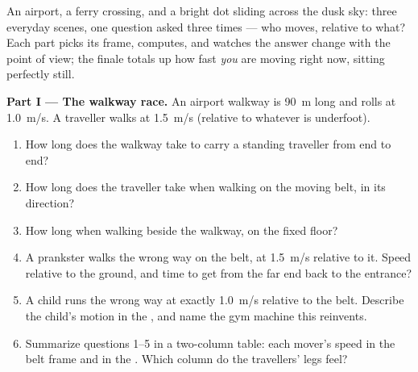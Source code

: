 \begin{problem}
\label{pb:g10:relative-motion:1}
An airport, a ferry crossing, and a bright dot sliding across the dusk
sky: three everyday scenes, one question asked three times --- who
moves, relative to what? Each part picks its frame, computes, and
watches the answer change with the point of view; the finale totals up
how fast \emph{you} are moving right now, sitting perfectly still.

\medskip
\noindent\textbf{Part I --- The walkway race.}
An airport walkway is \qty{90}{m} long and rolls at \qty{1.0}{m/s}. A
traveller walks at \qty{1.5}{m/s} (relative to whatever is underfoot).
\begin{enumerate}
  \item How long does the walkway take to carry a standing traveller
        from end to end?
  \item How long does the traveller take when walking on the moving
        belt, in its direction?
  \item How long when walking beside the walkway, on the fixed floor?
  \item A prankster walks the wrong way on the belt, at \qty{1.5}{m/s}
        relative to it. Speed relative to the ground, and time to get
        from the far end back to the entrance?
  \item A child runs the wrong way at exactly \qty{1.0}{m/s} relative
        to the belt. Describe the child's motion in the ,
        and name the gym machine this reinvents.
  \item Summarize questions 1--5 in a two-column table: each mover's
        speed in the belt frame and in the . Which column
        do the travellers' legs feel?
\end{enumerate}


\end{problem}
